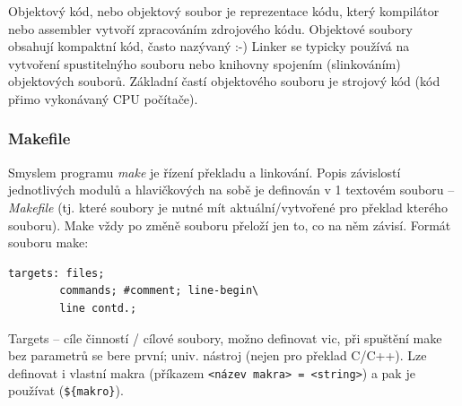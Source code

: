 Objektový kód, nebo objektový soubor je reprezentace kódu, který kompilátor nebo assembler vytvoří zpracováním zdrojového kódu. Objektové soubory obsahují kompaktní kód, často nazývaný  :-) Linker se typicky používá na vytvoření spustitelnýho souboru nebo knihovny spojením (slinkováním) objektových souborů. Základní častí objektového souboru je strojový kód (kód přimo vykonávaný CPU počítače).

\subsubsection*{Makefile}

Smyslem programu \emph{make} je řízení překladu a linkování. Popis závislostí jednotlivých modulů a hlavičkových na sobě je definován v 1 textovém souboru -- \emph{Makefile} (tj. které soubory je nutné mít aktuální/vytvořené pro překlad kterého souboru). Make vždy po změně souboru přeloží jen to, co na něm závisí.
Formát souboru make:
\begin{verbatim}
targets: files; 
        commands; #comment; line-begin\
        line contd.;
\end{verbatim}
Targets -- cíle činností / cílové soubory, možno definovat vic, při spuštění make bez parametrů se bere první; univ. nástroj (nejen pro překlad C/C++). Lze definovat i vlastní makra (příkazem \texttt{<název makra> = <string>}) a pak je používat (\texttt{\$\{makro\}}).
